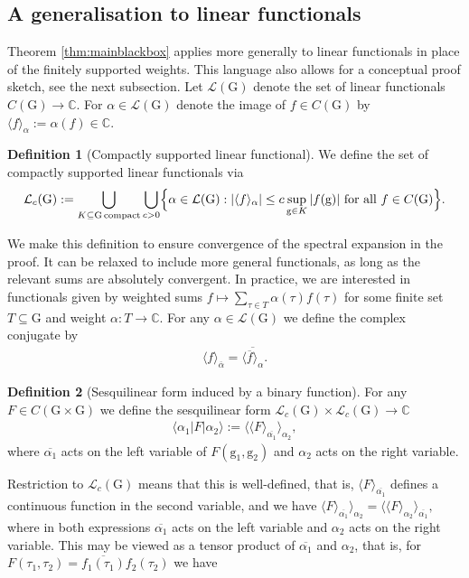 \documentclass[12pt]{amsart}
\theoremstyle{definition}
\newtheorem{definition}{Definition}
\theoremstyle{remark}
\numberwithin{equation}{section}
\newcommand{\G}{\mathrm{G}}
\newcommand{\C}{{\mathbb C}}
\newcommand{\1}{{\mathbf 1}}
\newcommand{\g}{\mathrm{g}}
\begin{document}
\subsection{A generalisation to linear functionals} 
Theorem \ref{thm:mainblackbox} applies more generally to linear functionals in place of the finitely supported weights. This language also allows for a conceptual proof sketch, see the next subsection. Let $\mathcal{L}(\G)$  denote the set of linear functionals $C(\G) \to \C$. For $\alpha \in \mathcal{L}(\G)$ denote the image of $ f \in C(\G)$ by $\langle f\rangle_\alpha  := \alpha(f) \in \C$. 
\begin{definition}[Compactly supported linear functional]
We define the set of compactly supported linear functionals via
\begin{align*}
    \mathcal{L}_c(\G) := \bigcup_{K \subseteq \G \, \text{compact}} \bigcup_{c>0}\Bigl\{\alpha \in \mathcal{L}(\G):     |  \langle f \rangle_\alpha| \leq c \sup_{\g \in K}  |f(\g)| \text{ for all } f \in C(\G)\Bigr \}.
\end{align*}
\end{definition}
We make this definition to ensure convergence of the spectral expansion in the proof. It can be relaxed to include more general functionals, as long as the relevant sums are absolutely convergent. In practice, we are interested in functionals given by weighted sums $f \mapsto \sum_{\tau \in T}  \alpha(\tau)f(\tau)$ for some finite set $T \subseteq 
 \G$ and weight $\alpha:T \to \C$. For any $\alpha \in \mathcal{L}(\G)$ we define the complex conjugate by 
\begin{align*}
  \langle f \rangle_{\overline{\alpha}} =  \overline{ \langle \overline{f} \rangle_{\alpha} } .
\end{align*}
\begin{definition}[Sesquilinear form induced by a binary function]
For any  $F \in C(\G \times \G)$ we define the sesquilinear form  $\mathcal{L}_c(\G) \times \mathcal{L}_c(\G) \to \C$ 
\begin{align*}
 \langle \alpha_1 | F | \alpha_2 \rangle := \langle \langle F \rangle_{\overline{\alpha_1}} \rangle_{\alpha_2},
\end{align*}
where $\overline{\alpha_1}$ acts on the left variable of $F(\g_1,\g_2)$ and $\alpha_2$  acts on the right variable.
\end{definition}
Restriction to $\mathcal{L}_c(\G)$ means that this is well-defined, that is, $\langle F \rangle_{\overline{\alpha_1}}$ defines a continuous function in the second variable, and we have $\langle F \rangle_{\overline{\alpha_1}} \rangle_{\alpha_2} = \langle \langle F \rangle_{\alpha_2} \rangle_{\overline{\alpha_1}},$  where in both expressions $\overline{\alpha_1}$ acts on the left variable and $\alpha_2$  acts on the right variable. This may be viewed as a tensor product of $\overline{\alpha_1}$ and $ \alpha_2$, that is, for $F(\tau_1,\tau_2) =\overline{f_1(\tau_1)} f_2(\tau_2)$ we have
\end{document}
